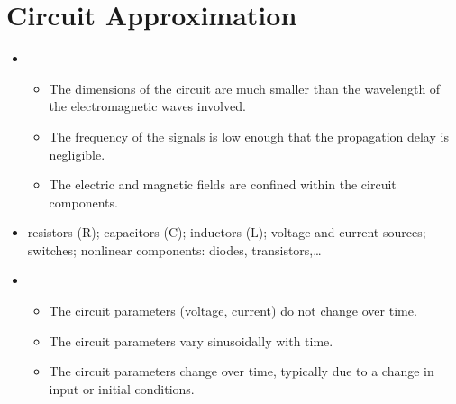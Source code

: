\documentclass[letterpaper,10pt,english]{jupyterBook}
\begin{document}
\chapter{Circuit Approximation}
\label{\detokenize{ch/circuits:circuit-approximation}}\label{\detokenize{ch/circuits:classical-electromagnetism-electrical-engineering}}\label{\detokenize{ch/circuits::doc}}
\sphinxAtStartPar
{}
\begin{itemize}
\item {} 
\sphinxAtStartPar
{}
\begin{itemize}
\item {} 
\sphinxAtStartPar
The dimensions of the circuit are much smaller than the wavelength of the electromagnetic waves involved.

\item {} 
\sphinxAtStartPar
The frequency of the signals is low enough that the propagation delay is negligible.

\item {} 
\sphinxAtStartPar
The electric and magnetic fields are confined within the circuit components.

\end{itemize}

\item {} 
\sphinxAtStartPar
{} resistors (R); capacitors (C); inductors (L); voltage and current sources; switches; non\sphinxhyphen{}linear components: diodes, transistors,…

\item {} 
\sphinxAtStartPar
{}
\begin{itemize}
\item {} 
\sphinxAtStartPar
{} The circuit parameters (voltage, current) do not change over time.

\item {} 
\sphinxAtStartPar
{} The circuit parameters vary sinusoidally with time.

\item {} 
\sphinxAtStartPar
{} The circuit parameters change over time, typically due to a change in input or initial conditions.

\end{itemize}

\end{itemize}
\end{document}
